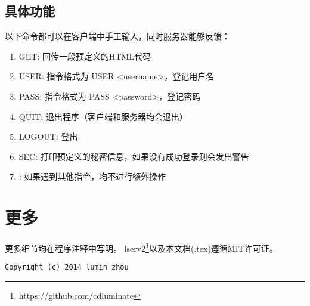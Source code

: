 \documentclass[a4paper,12pt]{article}
\begin{document}
\begin{CJK}{UTF8}{gbsn}
	\subsection{具体功能}
		以下命令都可以在客户端中手工输入，同时服务器能够反馈：
		\begin{enumerate}
		\item GET: 回传一段预定义的HTML代码
		\item USER: 指令格式为 USER <username>，登记用户名
		\item PASS: 指令格式为 PASS <password>，登记密码
		\item QUIT: 退出程序（客户端和服务器均会退出）
		\item LOGOUT: 登出
		\item SEC: 打印预定义的秘密信息，如果没有成功登录则会发出警告
		\item \*: 如果遇到其他指令，均不进行额外操作
		\end{enumerate}

\section{更多}
	更多细节均在程序注释中写明。
	lserv2\footnote{https://github.com/cdluminate}以及本文档(.tex)遵循MIT许可证。
	\begin{verbatim}
Copyright (c) 2014 lumin zhou
	\end{verbatim}

\end{CJK}
\end{document}
